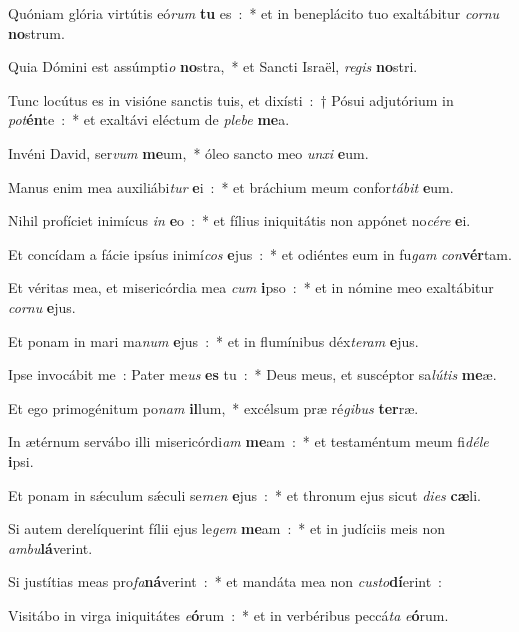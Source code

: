 \item Quóniam glória virtútis eó\emph{rum} \textbf{tu} es~:~* et in beneplácito tuo exaltábitur \emph{cor}\emph{nu} \textbf{no}strum.
\item Quia Dómini est assúmpti\emph{o} \textbf{no}stra,~* et Sancti Israël, \emph{re}\emph{gis} \textbf{no}stri.
\item Tunc locútus es in visióne sanctis tuis, et dixísti~:~† Pósui adjutórium in \emph{pot}\textbf{én}te~:~* et exaltávi eléctum de \emph{ple}\emph{be} \textbf{me}a.
\item Invéni David, ser\emph{vum} \textbf{me}um,~* óleo sancto meo \emph{un}\emph{xi} \textbf{e}um.
\item Manus enim mea auxiliábi\emph{tur} \textbf{e}i~:~* et bráchium meum confor\emph{tá}\emph{bit} \textbf{e}um.
\item Nihil profíciet inimícus \emph{in} \textbf{e}o~:~* et fílius in\-i\-qui\-tá\-tis non appónet no\emph{cé}\emph{re} \textbf{e}i.
\item Et concídam a fácie ipsíus inimí\emph{cos} \textbf{e}jus~:~* et odiéntes eum in fu\emph{gam} \emph{con}\textbf{vér}tam.
\item Et véritas mea, et misericórdia mea \emph{cum} \textbf{i}pso~:~* et in nómine meo exaltábitur \emph{cor}\emph{nu} \textbf{e}jus.
\item Et ponam in mari ma\emph{num} \textbf{e}jus~:~* et in flumínibus déx\emph{te}\emph{ram} \textbf{e}jus.
\item Ipse invocábit me~: Pater me\emph{us} \textbf{es} tu~:~* Deus meus, et suscéptor sa\emph{lú}\emph{tis} \textbf{me}æ.
\item Et ego primogénitum po\emph{nam} \textbf{il}lum,~* excélsum præ ré\emph{gi}\emph{bus} \textbf{ter}ræ.
\item In ætérnum servábo illi misericórdi\emph{am} \textbf{me}am~:~* et testaméntum meum fi\emph{dé}\emph{le} \textbf{i}psi.
\item Et ponam in sǽculum sǽculi se\emph{men} \textbf{e}jus~:~* et thronum ejus sicut \emph{di}\emph{es} \textbf{cæ}li.
\item Si autem derelíquerint fílii ejus le\emph{gem} \textbf{me}am~:~* et in judíciis meis non \emph{am}\emph{bu}\textbf{lá}verint.
\item Si justítias meas pro\emph{fa}\textbf{ná}verint~:~* et mandáta mea non \emph{cu}\emph{sto}\textbf{dí}erint~:
\item Visitábo in virga iniquitátes \emph{e}\textbf{ó}rum~:~* et in verbéribus peccá\emph{ta} \emph{e}\textbf{ó}rum.
